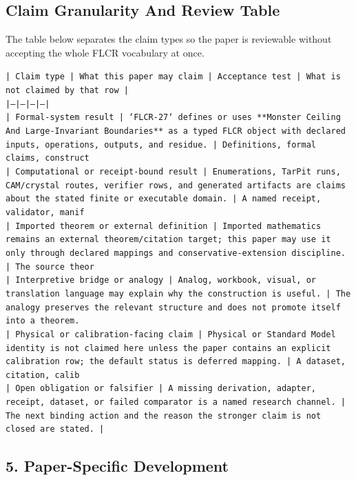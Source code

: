 \documentclass[11pt]{article}
\begin{document}
\subsection*{Claim Granularity And Review Table}

The table below separates the claim types so the paper is reviewable without accepting the whole FLCR vocabulary at once.

\noindent\texttt{| Claim type | What this paper may claim | Acceptance test | What is not claimed by that row |}\\
\noindent\texttt{|---|---|---|---|}\\
\noindent\texttt{| Formal-system result | `FLCR-27` defines or uses **Monster Ceiling And Large-Invariant Boundaries** as a typed FLCR object with declared inputs, operations, outputs, and residue. | Definitions, formal claims, construct}\\
\noindent\texttt{| Computational or receipt-bound result | Enumerations, TarPit runs, CAM/crystal routes, verifier rows, and generated artifacts are claims about the stated finite or executable domain. | A named receipt, validator, manif}\\
\noindent\texttt{| Imported theorem or external definition | Imported mathematics remains an external theorem/citation target; this paper may use it only through declared mappings and conservative-extension discipline. | The source theor}\\
\noindent\texttt{| Interpretive bridge or analogy | Analog, workbook, visual, or translation language may explain why the construction is useful. | The analogy preserves the relevant structure and does not promote itself into a theorem. }\\
\noindent\texttt{| Physical or calibration-facing claim | Physical or Standard Model identity is not claimed here unless the paper contains an explicit calibration row; the default status is deferred mapping. | A dataset, citation, calib}\\
\noindent\texttt{| Open obligation or falsifier | A missing derivation, adapter, receipt, dataset, or failed comparator is a named research channel. | The next binding action and the reason the stronger claim is not closed are stated. | }\\

\subsection*{5. Paper-Specific Development}
\end{document}
